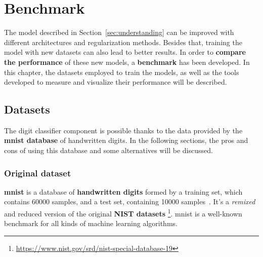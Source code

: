 \chapter{Benchmark}\label{ch:benchmark}
The model described in Section~\ref{sec:understanding} can be improved with different architectures and regularization methods. Besides that, training the model with new datasets can also lead to better results. In order to \textbf{compare the performance} of these new models, a \textbf{benchmark} has been developed. In this chapter, the datasets employed to train the models, as well as the tools developed to measure and visualize their performance will be described.

\section{Datasets}\label{sec:datasets}
The digit classifier component is possible thanks to the data provided by the \textbf{\gls{mnist} database} of handwritten digits. In the following sections, the pros and cons of using this database and some alternatives will be discussed.

\subsection{Original dataset}\label{subsec:MNIST}
\textbf{\gls{mnist}} is a database of \textbf{handwritten digits} formed by a training set, which contains 60000 samples, and a test set, containing 10000 samples~\cite{lecun-mnisthandwrittendigit-2010}. It's a \textit{remixed} and reduced version of the original \textbf{NIST datasets} \footnote{\url{https://www.nist.gov/srd/nist-special-database-19}}. \gls{mnist} is a well-known benchmark for all kinds of machine learning algorithms.

